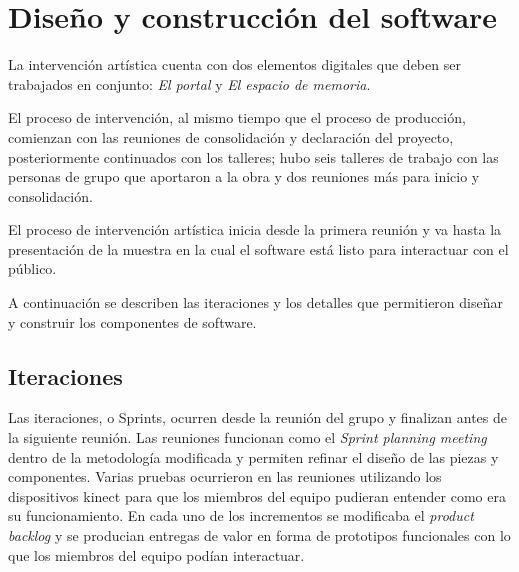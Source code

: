 \chapter{Diseño y construcción del software}

La intervención artística cuenta con dos elementos digitales que deben ser trabajados en conjunto: \textit{El portal} y \textit{El espacio de memoria}.

El proceso de intervención, al mismo tiempo que el proceso de producción, comienzan con las reuniones de consolidación y declaración del proyecto, posteriormente continuados con los talleres; hubo seis talleres de trabajo con las personas de grupo que aportaron a la obra y dos reuniones más para inicio y consolidación.

El proceso de intervención artística inicia desde la primera reunión y va hasta la presentación de la muestra en la cual el software está listo para interactuar con el público.

A continuación se describen las iteraciones y los detalles que permitieron diseñar y construir los componentes de software.

\section{Iteraciones}

Las iteraciones, o Sprints, ocurren desde la reunión del grupo y finalizan antes de la siguiente reunión. Las reuniones funcionan como el \textit{Sprint planning meeting} dentro de la metodología modificada y permiten refinar el diseño de las piezas y componentes. Varias pruebas ocurrieron en las reuniones utilizando los dispositivos kinect para que los miembros del equipo pudieran entender como era su funcionamiento. En cada uno de los incrementos se modificaba el \textit{product backlog} y se producian entregas de valor en forma de prototipos funcionales con lo que los miembros del equipo podían interactuar. 
